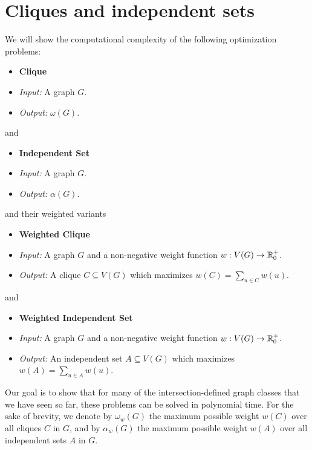 \chapter{Cliques and independent sets}

We will show the computational complexity of the following optimization problems:

\begin{itemize}[]
	\item \textbf{Clique}
	\item \textit{Input:} A graph $G$.
	\item \textit{Output:} $\omega(G)$.
\end{itemize}

and

\begin{itemize} []
	\item \textbf{Independent Set}
	\item \textit{Input:} A graph $G$.
	\item \textit{Output:} $\alpha(G)$.
\end{itemize}

and their weighted variants

\begin{itemize}[]
	\item \textbf{Weighted Clique}
	\item \textit{Input:} A graph $G$ and a non-negative weight function $w : V(G) \to \mathbb{R}_0^+$.
	\item \textit{Output:} A clique $C \subseteq V(G)$ which maximizes $w(C) = \sum_{u \in C} w(u)$.
\end{itemize}

and

\begin{itemize}[]
	\item \textbf{Weighted Independent Set}
	\item \textit{Input:} A graph $G$ and a non-negative weight function $w : V(G) \to \mathbb{R}_0^+$.
	\item \textit{Output:} An independent set $A \subseteq V(G)$ which maximizes $w(A) = \sum_{u \in A} w(u)$.
\end{itemize}

Our goal is to show that for many of the intersection-defined graph classes that we have seen so far, these problems can be solved in polynomial time. For the sake of brevity, we denote by $\omega_w(G)$ the maximum possible weight $w(C)$ over all cliques $C$ in $G$, and by $\alpha_w(G)$ the maximum possible weight $w(A)$ over all independent sets $A$ in $G$.

